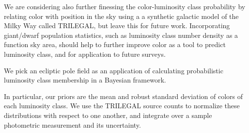 We are considering also further finessing the color-luminosity class probability by relating color with position in the sky using a a synthetic galactic model of the Milky Way called TRILEGAL, but leave this for future work. Incorporating giant/dwarf population statistics, such as luminosity class number density as a function sky area, should help to further improve color as a tool to predict luminosity class, and for application to future surveys.

We pick an ecliptic pole field as an application of calculating probabilistic luminosity class membership in a Bayesian framework.

In particular, our priors are the mean and robust standard deviation of colors of each luminosity class. We use the TRILEGAL source counts to normalize these distributions with respect to one another, and integrate over a sample photometric measurement and its uncertainty.

